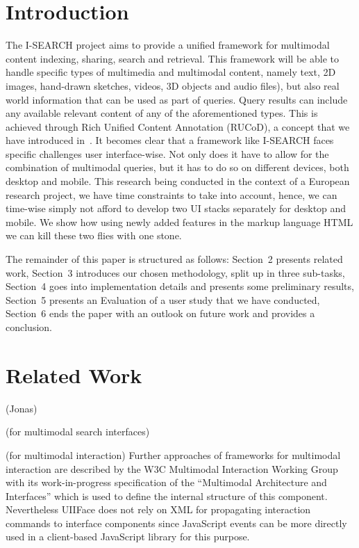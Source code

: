 \documentclass[runningheads,a4paper]{llncs} \usepackage[utf8]{inputenc}
\begin{document}
\section{Introduction}
The I-SEARCH project aims to provide a unified framework for multimodal content indexing, sharing, search and retrieval. This framework will be able to handle specific types of multimedia and multimodal content, namely text, 2D images, hand-drawn sketches, videos, 3D objects and audio files), but also real world information that can be used as part of queries. Query results can include any available relevant content of any of the aforementioned types. This is achieved through Rich Unified Content Annotation (RUCoD), a concept that we have introduced in~\cite{ijmis}. It becomes clear that a framework like I-SEARCH faces specific challenges user interface-wise. Not only does it have to allow for the combination of multimodal queries, but it has to do so on different devices, both desktop and mobile. This research being conducted in the context of a European research project, we have time constraints to take into account, hence, we can time-wise simply not afford to develop two UI stacks separately for desktop and mobile. We show how using newly added features in the markup language HTML  we can kill these two flies with one stone.

The remainder of this paper is structured as follows: Section~2 presents related work, Section~3 introduces our chosen methodology, split up in three sub-tasks, Section~4 goes into implementation details and presents some preliminary results, Section~5 presents an Evaluation of a user study that we have conducted, Section~6 ends the paper with an outlook on future work and provides a conclusion.

\section{Related Work}
(Jonas) \cite{nigay}

(for multimodal search interfaces)

(for multimodal interaction)
Further approaches of frameworks for multimodal interaction are described by the W3C 
Multimodal Interaction Working Group with its work-in-progress specification of the 
``Multimodal Architecture and Interfaces'' \cite{w3cMMI} which is used to define the
internal structure of this component. Nevertheless UIIFace does not rely on XML
for propagating interaction commands to interface components since JavaScript
events can be more directly used in a client-based JavaScript library for this
purpose.
\end{document}
